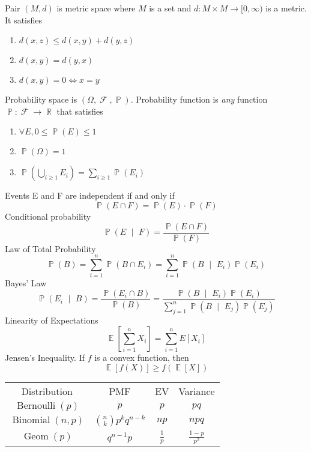 \documentclass[10pt,landscape,a4paper]{article}
\newenvironment{topic}[1]
{\begin{mdframed}[
    linecolor=black,
    frametitle=#1,
    frametitlebackgroundcolor=black!5,
  ]}
{\end{mdframed}}
\DeclareMathOperator{\prob}{\mathbb{P}}
\DeclareMathOperator{\E}{\mathbb{E}}
\DeclareMathOperator{\F}{\mathcal{F}}
\DeclareMathOperator{\R}{\mathbb{R}}
\DeclareMathOperator{\given}{\: \vert \:}
\DeclareMathOperator{\bernoulli}{Bernoulli}
\DeclareMathOperator{\binomial}{Binomial}
\DeclareMathOperator{\geometric}{Geom}
\newcommand{\summation}[1][i = 1]{\sum_{#1}^{n}}
\begin{document}
\thispagestyle{empty}

\begin{multicols}{3}

  \begin{topic}{Topology}
    Pair $(M, d)$ is metric space where $M$ is a set and $d: M \times M \rightarrow [0,\infty)$
    is a metric. It satisfies
    \begin{enumerate}
      \item $d(x, z) \leq d(x, y) + d(y, z)$
      \item $d(x, y) = d(y, x)$
      \item $d(x, y) = 0 \Leftrightarrow x = y$
    \end{enumerate}
  \end{topic}

  \begin{topic}{Probability}
    Probability space is $(\Omega, \F, \prob)$.
    Probability function is \emph{any} function $\prob : \F \rightarrow \R$
    that satisfies
    \begin{enumerate}
      \item $\forall E, 0 \leq \prob(E) \leq 1$
      \item $\prob(\Omega) = 1$
      \item $\prob \left( \bigcup\limits_{i \geq 1} E_i \right)
        = \sum\limits_{i \geq 1} \prob(E_i)$
    \end{enumerate}
    Events E and F are independent if and only if
    \[
      \prob(E \cap F) = \prob(E) \cdot \prob(F)
    \]
    Conditional probability
    \[
      \prob(E \given F) = \frac{\prob(E \cap F)}{\prob(F)}
    \]
    Law of Total Probability
    \[
      \prob(B)
      = \summation \prob(B \cap E_i)
      = \summation \prob(B \given E_i) \prob(E_i)
    \]
    Bayes' Law
    \[
      \prob(E_i \given B)
      = \frac{\prob(E_i \cap B)}{\prob(B)}
      = \frac{\prob(B \given E_i) \prob(E_i)}
      {\summation[j = 1] \prob(B \given E_j) \prob(E_j)}
    \]
    Linearity of Expectations
    \[
      \E \left[ \sum_{i = 1}^n X_i \right]
      = \sum_{i = 1}^n E[X_i]
    \]
    Jensen's Inequality. If $f$ is a convex function, then
    \[
      \E[ f(X) ] \geq f( \E[X] )
    \]
  \end{topic}

  \begin{topic}{Distributions}
    \begin{tabular}{cccc}
      Distribution & PMF & EV & Variance \\
      $\bernoulli(p)$ & $p$ & $p$ & $pq$ \\
      $\binomial(n,p)$ & $\binom{n}{k} p^k q^{n-k}$ & $np$ & $npq$ \\
      $\geometric(p)$ & $q^{n-1}p$ & $\frac{1}{p}$ & $\frac{1-p}{p^2}$ \\
    \end{tabular}
  \end{topic}


\end{multicols}
\end{document}
